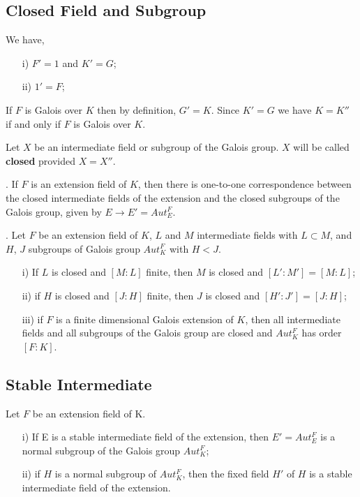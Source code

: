   \subsection{Closed Field and Subgroup}
  We have,
  \begin{enumerate}
  \item[i)] \(F'=1\) and \(K'=G\);
  \item[ii)] \(1'=F\);
    \end{enumerate}

    If \(F\) is Galois over \(K\) then by definition, \(G'=K\). Since \(K'=G\) we have \(K=K''\) if and only if \(F\) is Galois over \(K\).\\

\begin{definition}
  Let \(X\) be an intermediate field or subgroup of the Galois group. \(X\) will be called \textbf{closed} provided \(X=X''\).\\
\end{definition}

\begin{lemma}. If \(F\) is an extension field of \(K\), then there is one-to-one correspondence between the closed intermediate fields of the extension and the closed subgroups of the Galois group, given by \(E \rightarrow E' =  Aut_E^F\).\\
\end{lemma}

\begin{lemma}. Let \(F\) be an extension field of \(K\), \(L\) and \(M\) intermediate fields with \(L \subset M\), and \(H\), \(J\) subgroups of Galois group \(Aut_K^F\) with \(H<J\).
    \begin{enumerate}
    \item[i)] If \(L\) is closed and \([M:L]\) finite, then \(M\) is closed and \([L':M']=[M:L]\);
    \item[ii)] if \(H\) is closed and \([J:H]\) finite, then \(J\) is closed and \([H':J']=[J:H]\);
      \item[iii)] if \(F\) is a finite dimensional Galois extension of \(K\), then all intermediate fields and all subgroups of the Galois group are closed and \(Aut_K^F\) has order \([F:K]\).
\end{enumerate}
\end{lemma}


\subsection{Stable Intermediate}
\begin{lemma}
Let \(F\) be an extension field of K.
      \begin{enumerate}
      \item[i)] If E is a stable intermediate field of the extension, then \(E'=Aut_E^F\) is a normal subgroup of the Galois group \(Aut_K^F\);
        \item[ii)] if \(H\) is a normal subgroup of \(Aut_K^F\), then the fixed field \(H'\) of \(H\) is a stable intermediate field of the extension.
        \end{enumerate}
        \end{lemma}

